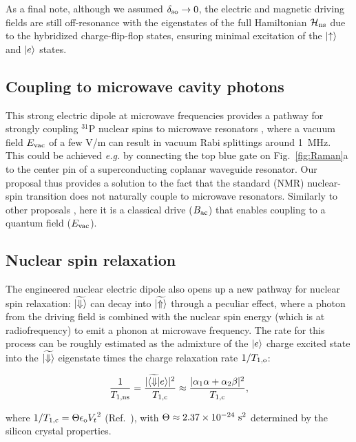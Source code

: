 As a final note, although we assumed $\delta_{\rm so} \rightarrow 0$, the electric and magnetic driving fields are still off-resonance with the eigenstates of the full Hamiltonian $\mathcal{H}_{\rm ns}$ due to the hybridized charge-flip-flop states, ensuring minimal excitation of the $\ket{\uparrow}$ and $\ket{e}$ states.

\subsection{Coupling to microwave cavity photons}

This strong electric dipole at microwave frequencies provides a pathway for strongly coupling $^{31}$P nuclear spins to microwave resonators \cite{Blais2004}, where a vacuum field $E_{\rm vac}$ of a few V/m can result in vacuum Rabi splittings around 1~MHz. This could be achieved \textit{e.g.} by connecting the top blue gate on Fig.~\ref{fig:Raman}a to the center pin of a superconducting coplanar waveguide resonator. Our proposal thus provides a solution to the fact that the standard (NMR) nuclear-spin transition does not naturally couple to microwave resonators. Similarly to other proposals  \cite{Pachos2002,Childress2004,Feng2008,Abanto2010}, here it is a classical drive ($B_{\rm ac}$) that enables coupling to a quantum field ($E_{\rm vac}$).

\subsection{Nuclear spin relaxation}

The engineered nuclear electric dipole also opens up a new pathway for nuclear spin relaxation: $\widetilde{\ket{\Downarrow}}$ can decay into $\widetilde{\ket{\Uparrow}}$ through a peculiar effect, where a photon from the driving field is combined with the nuclear spin energy (which is at radiofrequency) to emit a phonon at microwave frequency. The rate for this process can be roughly estimated as the admixture of the $\ket{e}$ charge excited state into the $\widetilde{\ket{\Downarrow}}$ eigenstate times the charge relaxation rate ${1}/{T_{1,\rm o}}$:

\begin{equation}\label{eq:T1ff}
\frac{1}{T_{1,\rm ns}}=\frac{|\widetilde{\bra{\Downarrow}}e\rangle|^2}{T_{1,\rm c}}\approx \frac{|\alpha_1\alpha+\alpha_2\beta|^2}{{T_{1,\rm c}}},
\end{equation}

where ${1}/{T_{1,\rm c}}=\Theta\epsilon_{\rm o}{V_t}^2$ (Ref.~\cite{Boross2016}), with $\Theta\approx2.37\times10^{-24}~{\rm s}^2$ determined by the silicon crystal properties. 

